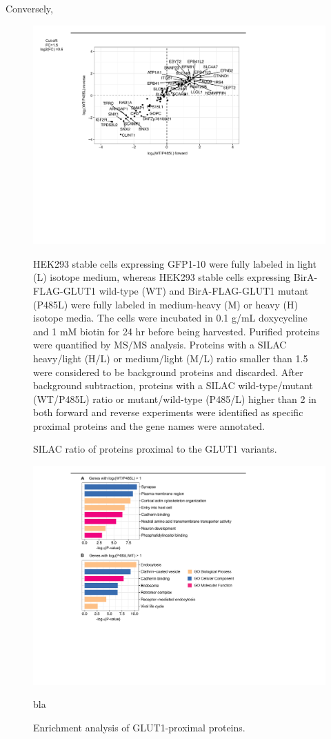 Conversely,
\begin{figure}[h]
\centering
\includegraphics[scale=0.7]{Figures/bioid2}
\caption{SILAC ratio of proteins proximal to the GLUT1 variants.}
\vspace*{-3mm}
\small \justify
HEK293 stable cells expressing GFP1-10 were fully labeled in light (L) isotope medium, whereas HEK293 stable cells expressing BirA-FLAG-GLUT1 wild-type (WT) and BirA-FLAG-GLUT1 mutant (P485L) were fully labeled in medium-heavy (M) or heavy (H) isotope media. The cells were incubated in 0.1 \textmu g/mL doxycycline and 1 mM biotin for 24 hr before being harvested. Purified proteins were quantified by MS/MS analysis. Proteins with a SILAC heavy/light (H/L) or medium/light (M/L) ratio smaller than 1.5 were considered to be background proteins and discarded. After background subtraction, proteins with a SILAC wild-type/mutant (WT/P485L) ratio or mutant/wild-type (P485/L) higher than 2 in both forward and reverse experiments were identified as specific proximal proteins and the gene names were annotated.
\label{fig:bioid2}
\end{figure}

\begin{figure}[h]
\centering
\includegraphics[scale=0.7]{Figures/GO}
\caption{Enrichment analysis of GLUT1-proximal proteins.}
\vspace*{-3mm}
\small \justify
bla
\label{fig:go}
\end{figure}

